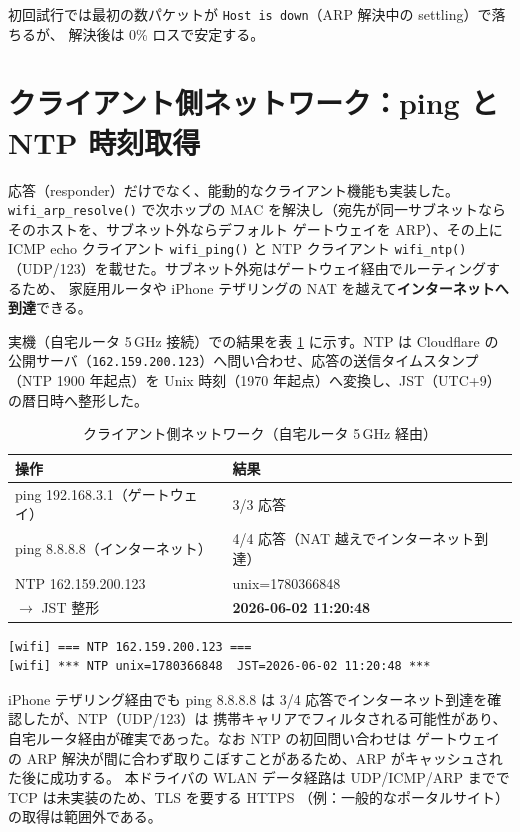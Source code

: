 \documentclass[a4paper,11pt]{ltjsarticle}
\begin{document}
初回試行では最初の数パケットが \texttt{Host is down}（ARP 解決中の settling）で落ちるが、
解決後は 0\% ロスで安定する。

\section{クライアント側ネットワーク：ping と NTP 時刻取得}
応答（responder）だけでなく、能動的なクライアント機能も実装した。\texttt{wifi\_arp\_resolve()}
で次ホップの MAC を解決し（宛先が同一サブネットならそのホストを、サブネット外ならデフォルト
ゲートウェイを ARP）、その上に ICMP echo クライアント \texttt{wifi\_ping()} と NTP クライアント
\texttt{wifi\_ntp()}（UDP/123）を載せた。サブネット外宛はゲートウェイ経由でルーティングするため、
家庭用ルータや iPhone テザリングの NAT を越えて\textbf{インターネットへ到達}できる。

実機（自宅ルータ 5\,GHz 接続）での結果を表 \ref{tab:client} に示す。NTP は Cloudflare の
公開サーバ（\texttt{162.159.200.123}）へ問い合わせ、応答の送信タイムスタンプ（NTP 1900 年起点）を
Unix 時刻（1970 年起点）へ変換し、JST（UTC+9）の暦日時へ整形した。

\begin{table}[h]
\centering
\caption{クライアント側ネットワーク（自宅ルータ 5\,GHz 経由）}
\label{tab:client}
\small
\begin{tabular}{@{}ll@{}}
\toprule
操作 & 結果 \\
\midrule
ping 192.168.3.1（ゲートウェイ） & 3/3 応答 \\
ping 8.8.8.8（インターネット） & 4/4 応答（NAT 越えでインターネット到達） \\
NTP 162.159.200.123 & unix=1780366848 \\
\quad $\to$ JST 整形 & \textbf{2026-06-02 11:20:48} \\
\bottomrule
\end{tabular}
\end{table}

\begin{lstlisting}[numbers=none,caption={NTP 時刻取得（実機トレース）}]
[wifi] === NTP 162.159.200.123 ===
[wifi] *** NTP unix=1780366848  JST=2026-06-02 11:20:48 ***
\end{lstlisting}

iPhone テザリング経由でも ping 8.8.8.8 は 3/4 応答でインターネット到達を確認したが、NTP（UDP/123）は
携帯キャリアでフィルタされる可能性があり、自宅ルータ経由が確実であった。なお NTP の初回問い合わせは
ゲートウェイの ARP 解決が間に合わず取りこぼすことがあるため、ARP がキャッシュされた後に成功する。
本ドライバの WLAN データ経路は UDP/ICMP/ARP までで TCP は未実装のため、TLS を要する HTTPS
（例：一般的なポータルサイト）の取得は範囲外である。
\end{document}
